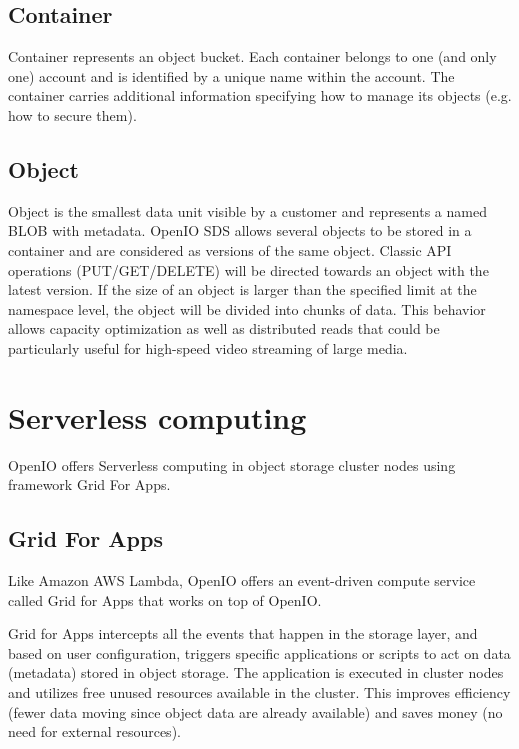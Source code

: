     \subsection{Container}
    Container represents an object bucket. Each container belongs to one (and only one) account and is identified by a unique name within the account. The container carries additional information specifying how to manage its objects (e.g. how to secure them)\cite{oioCoreSolution}.

    \subsection{Object}
    Object is the smallest data unit visible by a customer and represents a named BLOB with metadata. OpenIO SDS allows several objects to be stored in a container and are considered as versions of the same object. Classic API operations (PUT/GET/DELETE) will be directed towards an object with the latest version. If the size of an object is larger than the specified limit at the namespace level, the object will be divided into chunks of data. This behavior allows capacity optimization as well as distributed reads that could be particularly useful for high-speed video streaming of large media\cite{oioCoreSolution}.


    \section{Serverless computing}
    OpenIO offers Serverless computing in object storage cluster nodes using framework Grid For Apps.
    \subsection{Grid For Apps}\label{sec:oioGridForApps}

    Like Amazon AWS Lambda, OpenIO offers an event-driven compute service called Grid for Apps that works on top of OpenIO.

    Grid for Apps intercepts all the events that happen in the storage layer, and based on user configuration, triggers specific applications or scripts to act on data (metadata) stored in object storage\cite{oioNextGen}. The application is executed in cluster nodes and utilizes free unused resources available in the cluster. This improves efficiency (fewer data moving since object data are already available) and saves money (no need for external resources)\cite{oioNextGen}.


